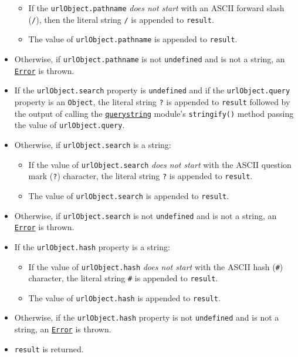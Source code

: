 \begin{itemize}
  \begin{itemize}
  \tightlist
  \item
    If the \texttt{urlObject.pathname} \emph{does not start} with an
    ASCII forward slash (\texttt{/}), then the literal string
    \texttt{\textquotesingle{}/\textquotesingle{}} is appended to
    \texttt{result}.
  \item
    The value of \texttt{urlObject.pathname} is appended to
    \texttt{result}.
  \end{itemize}
\item
  Otherwise, if \texttt{urlObject.pathname} is not \texttt{undefined}
  and is not a string, an \href{errors.md\#class-error}{\texttt{Error}}
  is thrown.
\item
  If the \texttt{urlObject.search} property is \texttt{undefined} and if
  the \texttt{urlObject.query} property is an \texttt{Object}, the
  literal string \texttt{?} is appended to \texttt{result} followed by
  the output of calling the \href{querystring.md}{\texttt{querystring}}
  module's \texttt{stringify()} method passing the value of
  \texttt{urlObject.query}.
\item
  Otherwise, if \texttt{urlObject.search} is a string:

  \begin{itemize}
  \tightlist
  \item
    If the value of \texttt{urlObject.search} \emph{does not start} with
    the ASCII question mark (\texttt{?}) character, the literal string
    \texttt{?} is appended to \texttt{result}.
  \item
    The value of \texttt{urlObject.search} is appended to
    \texttt{result}.
  \end{itemize}
\item
  Otherwise, if \texttt{urlObject.search} is not \texttt{undefined} and
  is not a string, an \href{errors.md\#class-error}{\texttt{Error}} is
  thrown.
\item
  If the \texttt{urlObject.hash} property is a string:

  \begin{itemize}
  \tightlist
  \item
    If the value of \texttt{urlObject.hash} \emph{does not start} with
    the ASCII hash (\texttt{\#}) character, the literal string
    \texttt{\#} is appended to \texttt{result}.
  \item
    The value of \texttt{urlObject.hash} is appended to \texttt{result}.
  \end{itemize}
\item
  Otherwise, if the \texttt{urlObject.hash} property is not
  \texttt{undefined} and is not a string, an
  \href{errors.md\#class-error}{\texttt{Error}} is thrown.
\item
  \texttt{result} is returned.
\end{itemize}

